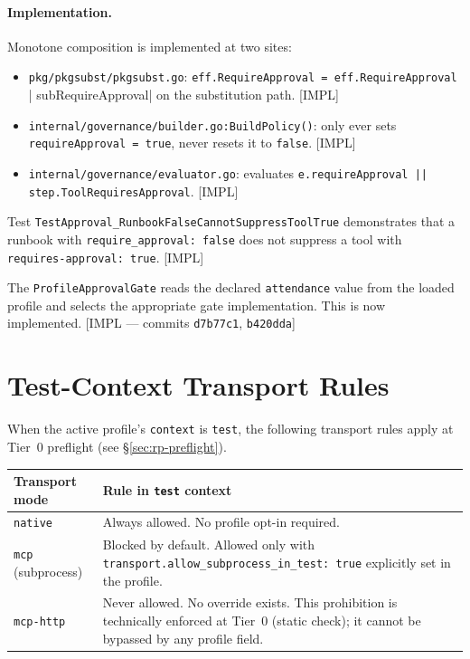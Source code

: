 \paragraph{Implementation.} Monotone composition is implemented at two sites:
\begin{itemize}[noitemsep]
  \item \texttt{pkg/pkgsubst/pkgsubst.go}:
        \verb|eff.RequireApproval = eff.RequireApproval || subRequireApproval|
        on the substitution path.  [IMPL]
  \item \texttt{internal/governance/builder.go:BuildPolicy()}: only ever sets
        \texttt{requireApproval = true}, never resets it to \texttt{false}.
        [IMPL]
  \item \texttt{internal/governance/evaluator.go}: evaluates
        \texttt{e.requireApproval || step.ToolRequiresApproval}.  [IMPL]
\end{itemize}

Test \texttt{TestApproval\_RunbookFalseCannotSuppressToolTrue} demonstrates
that a runbook with \texttt{require\_approval: false} does not suppress a tool
with \texttt{requires-approval: true}.  [IMPL]

\begin{tcolorbox}[colback=blue!5, colframe=blue!40,
  title=Non-Normative Note — Profile-Driven Approval Gate]
  The \texttt{ProfileApprovalGate} reads the declared \texttt{attendance}
  value from the loaded profile and selects the appropriate gate
  implementation.  This is now implemented.
  [IMPL — commits \texttt{d7b77c1}, \texttt{b420dda}]
\end{tcolorbox}

\section{Test-Context Transport Rules}
\label{sec:rp-test-transport}

When the active profile's \texttt{context} is \texttt{test}, the following
transport rules apply at Tier~0 preflight (see \S\ref{sec:rp-preflight}).

\begin{center}
\begin{longtable}{p{3cm}p{10cm}}
\toprule
\textbf{Transport mode} & \textbf{Rule in \texttt{test} context} \\
\midrule
\texttt{native} &
    Always allowed.  No profile opt-in required. \\
\texttt{mcp} (subprocess) &
    Blocked by default.  Allowed only with
    \texttt{transport.allow\_subprocess\_in\_test: true} explicitly set
    in the profile. \\
\texttt{mcp-http} &
    Never allowed.  No override exists.  This prohibition is
    technically enforced at Tier~0 (static check); it cannot be
    bypassed by any profile field. \\
\bottomrule
\end{longtable}
\end{center}


